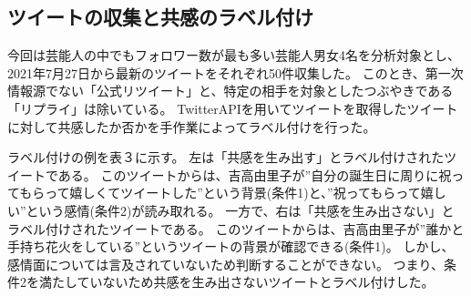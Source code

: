 \documentclass[dvipdfmx]{issj}
\begin{document}
\subsection{ツイートの収集と共感のラベル付け }  %
今回は芸能人の中でもフォロワー数が最も多い芸能人男女4名を分析対象とし、2021年7月27日から最新のツイートをそれぞれ50件収集した。
このとき、第一次情報源でない「公式リツイート」と、特定の相手を対象としたつぶやきである「リプライ」は除いている。
TwitterAPIを用いてツイートを取得したツイートに対して共感したか否かを手作業によってラベル付けを行った。


ラベル付けの例を表３に示す。
左は「共感を生み出す」とラベル付けされたツイートである。
このツイートからは、吉高由里子が”自分の誕生日に周りに祝ってもらって嬉しくてツイートした”という背景(条件1)と、”祝ってもらって嬉しい”という感情(条件2)が読み取れる。
一方で、右は「共感を生み出さない」とラベル付けされたツイートである。
このツイートからは、吉高由里子が”誰かと手持ち花火をしている”というツイートの背景が確認できる(条件1)。
しかし、感情面については言及されていないため判断することができない。
つまり、条件2を満たしていないため共感を生み出さないツイートとラベル付けした。
\end{document}

